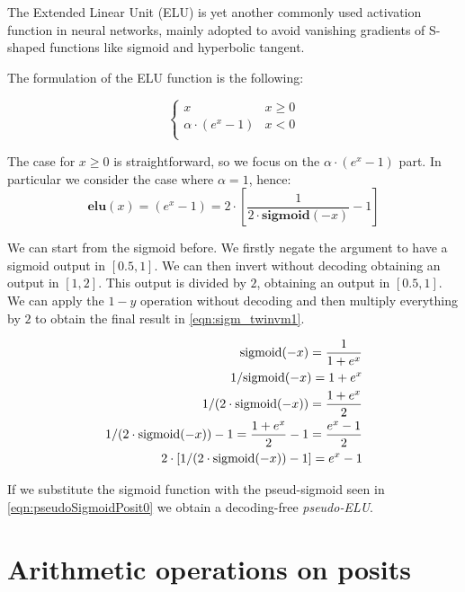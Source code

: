 The Extended Linear Unit (ELU) is yet another commonly used activation function in neural networks, mainly adopted to avoid vanishing gradients of S-shaped functions like sigmoid and hyperbolic tangent.

The formulation of the ELU function is the following:

\begin{equation}
\left\{\begin{matrix}
x & x \geq 0 \\
\alpha \cdot (e^x - 1) & x < 0  \\
\end{matrix}\right.
\end{equation}

The case for $x \geq 0$ is straightforward, so we focus on the $\alpha \cdot (e^x - 1)$ part. In particular we consider the case where $\alpha = 1$, hence:
\begin{equation}
    \mathbf{elu}(x) = (e^x - 1) = 2 \cdot \left [ \frac{1}{2\cdot \mathbf{sigmoid}(-x)} - 1 \right]
\end{equation}

We can start from the sigmoid before. We firstly negate the argument to have a sigmoid output in $[0.5,1]$. We can then invert without decoding obtaining an output in $[1,2]$. This output is divided by $2$, obtaining an output in $[0.5,1]$. We can apply the $1-y$ operation without decoding and then multiply everything by $2$ to obtain the final result in \eqref{eqn:sigm_twinvm1}.

\begin{align}
   \label{eqn:sigm_mx}\textnormal{sigmoid}(-x) = \frac{1}{1+e^{x}}  & \\
   \label{eqn:sigm_invx}1/\textnormal{sigmoid}(-x) = 1+e^x & \\
   \label{eqn:sigm_invtw}1/(2\cdot\textnormal{sigmoid}(-x)) = \frac{1+e^x}{2}& \\
   \label{eqn:sigm_invm1}1/(2\cdot\textnormal{sigmoid}(-x))-1 = \frac{1+e^x}{2} - 1 = \frac{e^x-1}{2} & \\
  \label{eqn:sigm_twinvm1}2\cdot[1/(2\cdot\textnormal{sigmoid}(-x))-1] = e^x -1&
\end{align}

If we substitute the sigmoid function with the pseud-sigmoid seen in \eqref{eqn:pseudoSigmoidPosit0} we obtain a decoding-free \textit{pseudo-ELU}.




\section{Arithmetic operations on posits}\label{sec:posit_ops}

